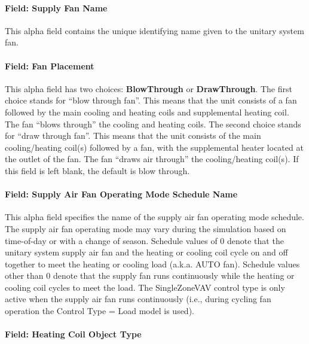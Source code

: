 \paragraph{Field: Supply Fan Name}\label{field-supply-fan-name}

This alpha field contains the unique identifying name given to the unitary system fan.

\paragraph{Field: Fan Placement}\label{field-fan-placement}

This alpha field has two choices: \textbf{BlowThrough} or \textbf{DrawThrough}. The first choice stands for ``blow through fan''. This means that the unit consists of a fan followed by the main cooling and heating coils and supplemental heating coil. The fan ``blows through'' the cooling and heating coils. The second choice stands for ``draw through fan''. This means that the unit consists of the main cooling/heating coil(s) followed by a fan, with the supplemental heater located at the outlet of the fan. The fan ``draws air through'' the cooling/heating coil(s). If this field is left blank, the default is blow through.

\paragraph{Field: Supply Air Fan Operating Mode Schedule Name}\label{supply-air-fan-operating-mode-schedule-name}

This alpha field specifies the name of the supply air fan operating mode schedule. The supply air fan operating mode may vary during the simulation based on time-of-day or with a change of season. Schedule values of 0 denote that the unitary system supply air fan and the heating or cooling coil cycle on and off together to meet the heating or cooling load (a.k.a. AUTO fan). Schedule values other than 0 denote that the supply fan runs continuously while the heating or cooling coil cycles to meet the load. The SingleZoneVAV control type is only active when the supply air fan runs continuously (i.e., during cycling fan operation the Control Type = Load model is used).

\paragraph{Field: Heating Coil Object Type}\label{field-heating-coil-object-type-002}


